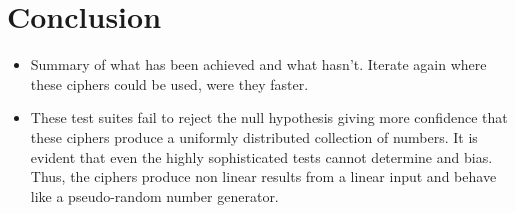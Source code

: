 \documentclass{Resources/UoBLab1}
\theoremstyle{definition}
\begin{document}
\section{Conclusion}
\begin{itemize}
    \item Summary of what has been achieved and what hasn't. Iterate again where these ciphers could be used, were they faster.
    \item These test suites fail to reject the null hypothesis giving more confidence that these ciphers produce a uniformly distributed collection of numbers.   It is evident that even the highly sophisticated tests cannot determine and bias. Thus, the ciphers produce non linear results from a linear input and behave like a pseudo-random number generator.
\end{itemize}
\end{document}
